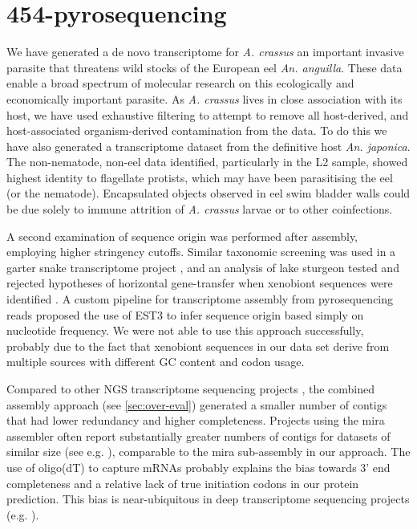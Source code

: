 \section{454-pyrosequencing}
\label{sec:454-pyr}

We have generated a de novo transcriptome for \textit{A. crassus} an
important invasive parasite that threatens wild stocks of the European
eel \textit{An. anguilla}. These data enable a broad spectrum of
molecular research on this ecologically and economically important
parasite. As \textit{A. crassus} lives in close association with its
host, we have used exhaustive filtering to attempt to remove all
host-derived, and host-associated organism-derived contamination from
the data. To do this we have also generated a transcriptome dataset
from the definitive host \textit{An. japonica}. The non-nematode,
non-eel data identified, particularly in the L2 sample, showed highest
identity to flagellate protists, which may have been parasitising the
eel (or the nematode). Encapsulated objects observed in eel swim
bladder walls \cite{heitlinger_massive_2009} could be due solely to
immune attrition of \textit{A. crassus} larvae or to other
coinfections.

A second examination of sequence origin was performed after assembly,
employing higher stringency cutoffs.  Similar taxonomic screening was
used in a garter snake transcriptome project \cite{pmid21138572}, and
an analysis of lake sturgeon tested and rejected hypotheses of
horizontal gene-transfer when xenobiont sequences were identified
\cite{pmid20386959}. A custom pipeline for transcriptome assembly from
pyrosequencing reads \cite{pmid20034392} proposed the use of EST3
\cite{pmid17218127} to infer sequence origin based simply on
nucleotide frequency. We were not able to use this approach
successfully, probably due to the fact that xenobiont sequences in our
data set derive from multiple sources with different GC content and
codon usage.

Compared to other NGS transcriptome sequencing projects
\cite{pmid20478048}, the combined assembly approach (see
\ref{sec:over-eval}) generated a smaller number of contigs that had
lower redundancy and higher completeness. Projects using the mira
assembler often report substantially greater numbers of contigs for
datasets of similar size (see e.g. \cite{pmid21364769}), comparable to
the mira sub-assembly in our approach. The use of oligo(dT) to capture
mRNAs probably explains the bias towards 3' end completeness and a
relative lack of true initiation codons in our protein
prediction. This bias is near-ubiquitous in deep transcriptome
sequencing projects (e.g. \cite{pmid20331785}).

